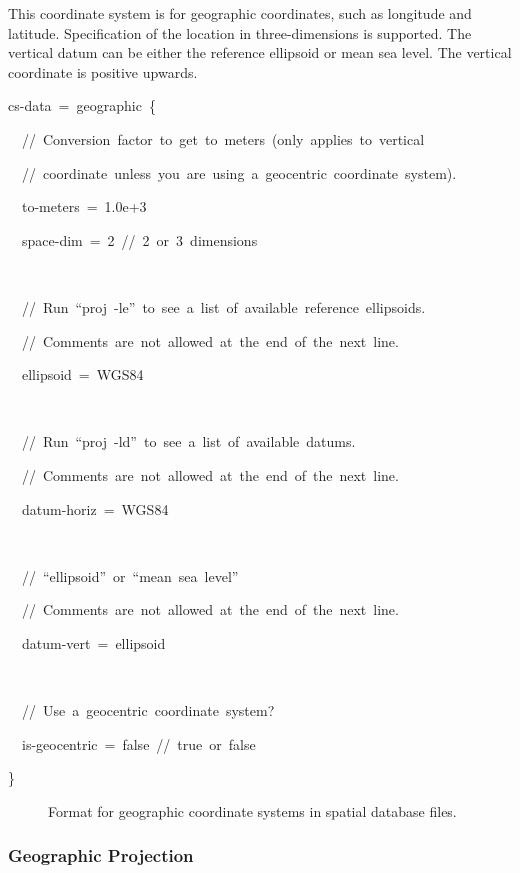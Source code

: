 This coordinate system is for geographic coordinates, such as longitude
and latitude. Specification of the location in three-dimensions is
supported. The vertical datum can be either the reference ellipsoid
or mean sea level. The vertical coordinate is positive upwards.
\begin{lyxcode}
cs-data~=~geographic~\{

~~//~Conversion~factor~to~get~to~meters~(only~applies~to~vertical~

~~//~coordinate~unless~you~are~using~a~geocentric~coordinate~system).

~~to-meters~=~1.0e+3

~~space-dim~=~2~//~2~or~3~dimensions

~

~~//~Run~``proj~-le''~to~see~a~list~of~available~reference~ellipsoids.

~~//~Comments~are~not~allowed~at~the~end~of~the~next~line.

~~ellipsoid~=~WGS84

~

~~//~Run~``proj~-ld''~to~see~a~list~of~available~datums.

~~//~Comments~are~not~allowed~at~the~end~of~the~next~line.

~~datum-horiz~=~WGS84

~

~~//~``ellipsoid''~or~``mean~sea~level''

~~//~Comments~are~not~allowed~at~the~end~of~the~next~line.

~~datum-vert~=~ellipsoid

~

~~//~Use~a~geocentric~coordinate~system?

~~is-geocentric~=~false~//~true~or~false

\}
\end{lyxcode}
\begin{figure}[H]
\caption{Format for geographic coordinate systems in spatial database files.}
\end{figure}



\subsubsection{Geographic Projection}

